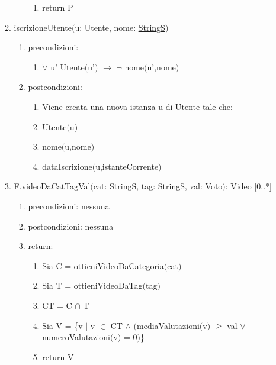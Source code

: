 \documentclass{article}
\begin{document}
\begin{enumerate}
\begin{enumerate}
\begin{enumerate}
\begin{enumerate}
                \item return P
            \end{enumerate}
        \end{enumerate}
        \newpage
        \item iscrizioneUtente$($u: Utente, nome: \hyperref[sec:TipoStringS]{StringS}$)$
        \begin{enumerate}
            \item precondizioni:
            \begin{enumerate}
                \item $\forall$ u' Utente$($u'$)$ $\rightarrow$ $\neg$ nome$($u',nome$)$
            \end{enumerate}
            \item postcondizioni:
            \begin{enumerate}
                \item Viene creata una nuova istanza u di Utente tale che:
                \item Utente$($u$)$
                \item nome$($u,nome$)$
                \item dataIscrizione$($u,istanteCorrente$)$
            \end{enumerate}
        \end{enumerate}
        \newpage
        \item F.videoDaCatTagVal$($cat: \hyperref[sec:TipoStringS]{StringS}, tag: \hyperref[sec:TipoStringS]{StringS}, val: \hyperref[sec:TipoVoto]{Voto}$)$: Video [0..*]
        \begin{enumerate}
            \item precondizioni: nessuna
            \item postcondizioni: nessuna
            \item return:
            \begin{enumerate}
                \item Sia C = ottieniVideoDaCategoria$($cat$)$
                \item Sia T = ottieniVideoDaTag$($tag$)$
                \item CT = C $\cap$ T
                \item Sia V = \{v $|$ v $\in$ CT $\land$ $($mediaValutazioni$($v$)$ $\geq$ val $\lor$ numeroValutazioni$($v$)$ = 0$)$\}
                \item return V
            \end{enumerate}
        \end{enumerate}

\end{enumerate}
\end{enumerate}
\end{document}
